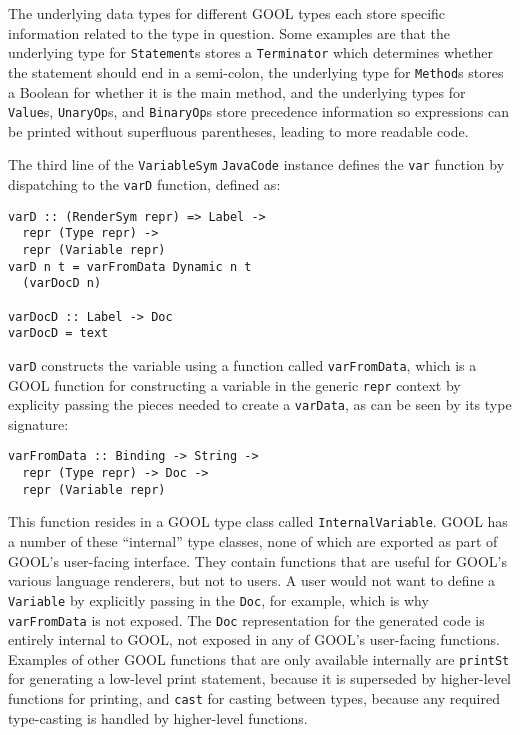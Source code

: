 \documentclass[sigplan,review,anonymous,prologue,dvipsnames]{acmart}
\begin{document}
The underlying data types for different GOOL types each store specific 
information related to the type in question. Some examples are that the 
underlying type for \verb|Statement|s stores a \verb|Terminator| which 
determines whether the statement should end in a semi-colon, the underlying 
type for \verb|Method|s stores a Boolean for whether it is the main method, and 
the underlying types for \verb|Value|s, \verb|UnaryOp|s, and \verb|BinaryOp|s 
store precedence information so expressions can be printed without superfluous 
parentheses, leading to more readable code.

The third line of the \verb|VariableSym| \verb|JavaCode| instance defines the 
\verb|var| function by dispatching to the \verb|varD| function, defined as:
\begin{lstlisting}
varD :: (RenderSym repr) => Label -> 
  repr (Type repr) -> 
  repr (Variable repr)
varD n t = varFromData Dynamic n t 
  (varDocD n)

varDocD :: Label -> Doc
varDocD = text
\end{lstlisting}
\verb|varD| constructs the variable using a function called \verb|varFromData|, 
which is a GOOL function for constructing a variable in the generic \verb|repr| 
context by explicity passing the pieces needed to create a \verb|varData|, as 
can be seen by its type signature:
\begin{lstlisting}
varFromData :: Binding -> String -> 
  repr (Type repr) -> Doc -> 
  repr (Variable repr)
\end{lstlisting}
This function resides in a GOOL type class called \verb|InternalVariable|. GOOL 
has a number of these ``internal'' type classes, none of which are exported as 
part of GOOL's user-facing interface. They contain functions that are useful 
for GOOL's various language renderers, but not to users. A user would not want 
to define a \verb|Variable| by explicitly passing in the \verb|Doc|, for 
example, which is why \verb|varFromData| is not exposed. The \verb|Doc| 
representation for the generated code is entirely internal to GOOL, not exposed 
in any of GOOL's user-facing functions. Examples of other GOOL functions that 
are only available internally are \verb|printSt| for generating a low-level 
print statement, because it is superseded by higher-level functions for 
printing, and \verb|cast| for casting between types, because any required 
type-casting is handled by higher-level functions.
\end{document}
